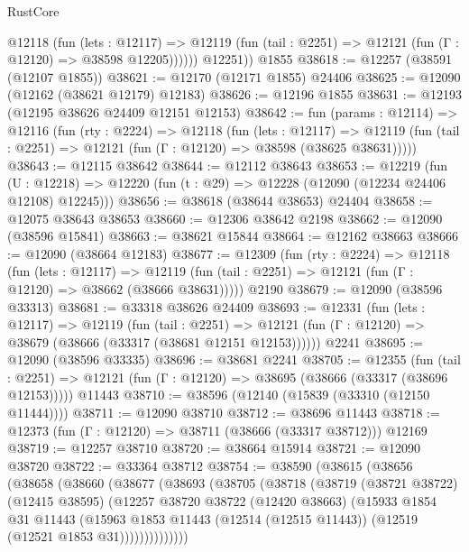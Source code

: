\begin{lexlean}{RustCore}
\begin{coremodule}
            @12118
              (fun (lets : @12117) =>
              @12119 (fun (tail : @2251) => @12121 (fun (Γ : @12120) => @38598 @12205))))))
        @12251))
    @1855
@38618 := @12257 (@38591 (@12107 @1855))
@38621 := @12170 (@12171 @1855) @24406
@38625 := @12090 (@12162 (@38621 @12179) @12183)
@38626 := @12196 @1855
@38631 := @12193 (@12195 @38626 @24409 @12151 @12153)
@38642 := fun (params : @12114) =>
  @12116
    (fun (rty : @2224) =>
    @12118
      (fun (lets : @12117) =>
      @12119 (fun (tail : @2251) => @12121 (fun (Γ : @12120) => @38598 (@38625 @38631)))))
@38643 := @12115 @38642
@38644 := @12112 @38643
@38653 := @12219
    (fun (U : @12218) => @12220 (fun (t : @29) => @12228 (@12090 (@12234 @24406 @12108) @12245)))
@38656 := @38618 (@38644 @38653) @24404
@38658 := @12075 @38643 @38653
@38660 := @12306 @38642 @2198
@38662 := @12090 (@38596 @15841)
@38663 := @38621 @15844
@38664 := @12162 @38663
@38666 := @12090 (@38664 @12183)
@38677 := @12309
    (fun (rty : @2224) =>
    @12118
      (fun (lets : @12117) =>
      @12119 (fun (tail : @2251) => @12121 (fun (Γ : @12120) => @38662 (@38666 @38631)))))
    @2190
@38679 := @12090 (@38596 @33313)
@38681 := @33318 @38626 @24409
@38693 := @12331
    (fun (lets : @12117) =>
    @12119
      (fun (tail : @2251) =>
      @12121 (fun (Γ : @12120) => @38679 (@38666 (@33317 (@38681 @12151 @12153))))))
    @2241
@38695 := @12090 (@38596 @33335)
@38696 := @38681 @2241
@38705 := @12355
    (fun (tail : @2251) => @12121 (fun (Γ : @12120) => @38695 (@38666 (@33317 (@38696 @12153)))))
    @11443
@38710 := @38596 (@12140 (@15839 (@33310 (@12150 @11444))))
@38711 := @12090 @38710
@38712 := @38696 @11443
@38718 := @12373 (fun (Γ : @12120) => @38711 (@38666 (@33317 @38712))) @12169
@38719 := @12257 @38710
@38720 := @38664 @15914
@38721 := @12090 @38720
@38722 := @33364 @38712
@38754 := @38590
    (@38615
      (@38656
        (@38658
          (@38660
            (@38677
              (@38693
                (@38705
                  (@38718
                    (@38719
                      (@38721 @38722)
                      (@12415 @38595)
                      (@12257
                        @38720
                        @38722
                        (@12420 @38663)
                        (@15933
                          @1854
                          @31
                          @11443
                          (@15963
                            @1853
                            @11443
                            (@12514 (@12515 @11443))
                            (@12519 (@12521 @1853 @31))))))))))))))

\end{coremodule}
\end{lexlean}
